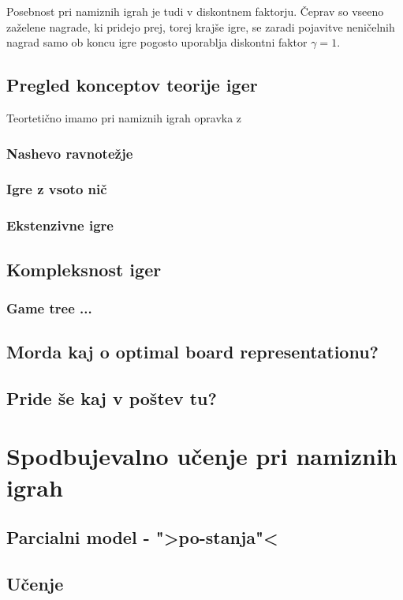 \documentclass[12pt,a4paper]{amsart}
\theoremstyle{definition} %
\theoremstyle{plain} %
\begin{document}
Posebnost pri namiznih igrah je tudi v diskontnem faktorju. Čeprav so vseeno zaželene nagrade, ki 
pridejo prej, torej krajše igre, se zaradi pojavitve neničelnih nagrad samo ob koncu igre pogosto 
uporablja diskontni faktor $\gamma = 1$.

\subsection{Pregled konceptov teorije iger}
Teortetično imamo pri namiznih igrah opravka z

\subsubsection{Nashevo ravnotežje}
\subsubsection{Igre z vsoto nič}
\subsubsection{Ekstenzivne igre}

\subsection{Kompleksnost iger}
\subsubsection{Game tree ...}

\subsection{Morda kaj o optimal board representationu?}
\subsection{Pride še kaj v poštev tu?}


\section{Spodbujevalno učenje pri namiznih igrah}

\subsection{Parcialni model - ">po-stanja"<}

\subsection{Učenje}
\end{document}
